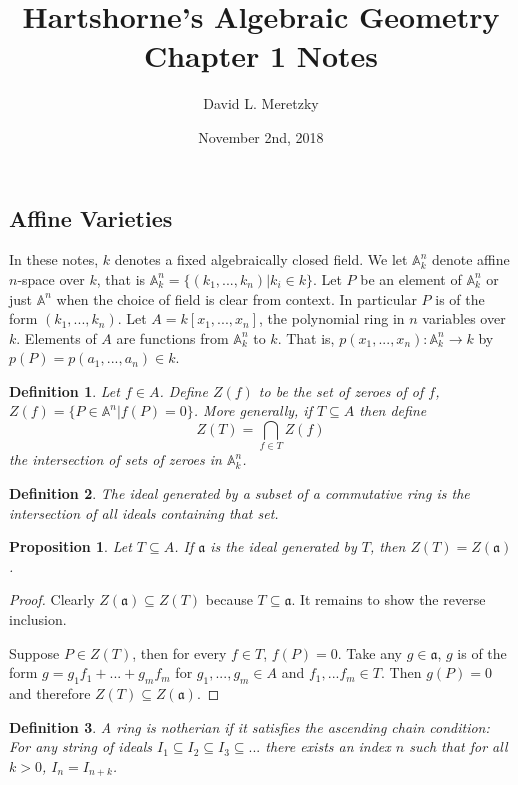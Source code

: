 \documentclass{article}
\title{ \vspace{-10ex} %
Hartshorne's Algebraic Geometry 
Chapter 1 Notes
}
\author{David L. Meretzky
}
\date{%
November 2nd, 2018
}
\theoremstyle{problemstyle}
\newtheorem{definition}{Definition}
\newtheorem{proposition}{Proposition}
\begin{document}
\maketitle

\subsection*{Affine Varieties}

In these notes, $k$ denotes a fixed algebraically closed field. We let $\mathbb{A}^n_k$ denote affine $n$-space over $k$, that is $\mathbb{A}^n_k = \{(k_1,...,k_n)|k_i \in k\}$. Let $P$ be an element of $\mathbb{A}^n_k$ or just $\mathbb{A}^n$ when the choice of field is clear from context. In particular $P$ is of the form $(k_1,...,k_n)$. Let $A = k[x_1,...,x_n]$, the polynomial ring in $n$ variables over $k$. Elements of $A$ are functions from $\mathbb{A}^n_k$ to $k$. That is, $p(x_1,...,x_n):\mathbb{A}^n_k \rightarrow k$ by $p(P) = p(a_1,...,a_n) \in k$. 

\begin{definition}
Let $f \in A$. Define $Z(f)$ to be the set of zeroes of of $f$, $Z(f) = \{P \in \mathbb{A}^n | f(P) = 0\}$. More generally, if $T \subseteq A$ then define $$Z(T) = \bigcap_{f \in T} Z(f)$$ the intersection of sets of zeroes in $\mathbb{A}^n_k$. 
\end{definition}

\begin{definition}
The ideal generated by a subset of a commutative ring is the intersection of all ideals containing that set. 
\end{definition}

\begin{proposition}
Let $T \subseteq A$. If $\mathfrak{a}$ is the ideal generated by $T$, then $Z(T) = Z(\mathfrak{a})$. 
\end{proposition}

\begin{proof}
Clearly $Z(\mathfrak{a}) \subseteq Z(T)$ because $T \subseteq \mathfrak{a}$. It remains to show the reverse inclusion. 

Suppose $P \in Z(T)$, then for every $f \in T$, $f(P) = 0$. Take any $g \in \mathfrak{a}$, $g$ is of the form $g = g_1f_1 + ... + g_mf_m$ for $g_1,...,g_m \in A$ and $f_1,...f_m \in T$.  Then $g(P) = 0$ and therefore  $Z(T) \subseteq Z(\mathfrak{a})$. 
\end{proof}

\begin{definition}
A ring is notherian if it satisfies the ascending chain condition: For any string of ideals $I_1 \subseteq I_2 \subseteq I_3 \subseteq ...$ there exists an index $n$ such that for all $k > 0$, $I_n = I_{n+k}$. 
\end{definition}
\end{document}
